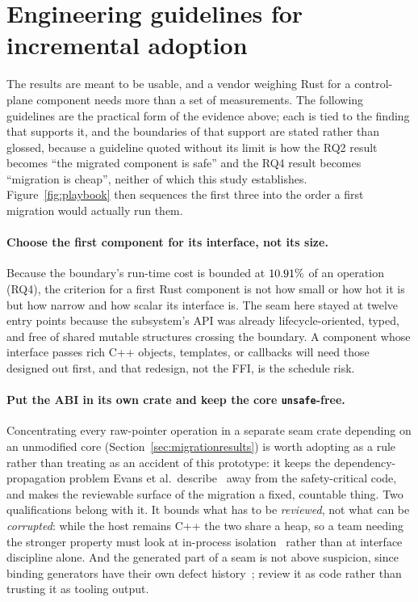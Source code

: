 \documentclass[english,twoside,openright,a4paper,censored,csm,software-track-2020]{HYthesisML}
\begin{document}
\section{Engineering guidelines for incremental adoption}
\label{sec:guidelines}
The results are meant to be usable, and a vendor weighing Rust for a control-plane component
needs more than a set of measurements. The following guidelines are the practical form of the
evidence above; each is tied to the finding that supports it, and the boundaries of that
support are stated rather than glossed, because a guideline quoted without its limit is how the
RQ2 result becomes ``the migrated component is safe'' and the RQ4 result becomes ``migration is
cheap'', neither of which this study establishes. Figure~\ref{fig:playbook} then sequences the
first three into the order a first migration would actually run them.

\paragraph{Choose the first component for its interface, not its size.}
Because the boundary's run-time cost is bounded at $10.91\%$ of an operation (RQ4), the
criterion for a first Rust component is not how small or how hot it is but how narrow and how
scalar its interface is. The seam here stayed at twelve entry points because the subsystem's API
was already lifecycle-oriented, typed, and free of shared mutable structures crossing the
boundary. A component whose interface passes rich C++ objects, templates, or callbacks will need
those designed out first, and that redesign, not the FFI, is the schedule risk.

\paragraph{Put the ABI in its own crate and keep the core \texttt{unsafe}-free.}
Concentrating every raw-pointer operation in a separate seam crate depending on an unmodified
core (Section~\ref{sec:migrationresults}) is worth adopting as a rule rather than treating as an
accident of this prototype: it keeps the dependency-propagation problem Evans et al.\
describe~\cite{evans2020rust} away from the safety-critical code, and makes the reviewable
surface of the migration a fixed, countable thing. Two qualifications belong with it. It bounds
what has to be \emph{reviewed}, not what can be \emph{corrupted}: while the host remains C++ the
two share a heap, so a team needing the stronger property must look at in-process
isolation~\cite{rivera2021galeed,kirth2022pkrusafe} rather than at interface discipline alone.
And the generated part of a seam is not above suspicion, since binding generators have their own
defect history~\cite{cai2026interop}; review it as code rather than trusting it as tooling
output.
\end{document}
